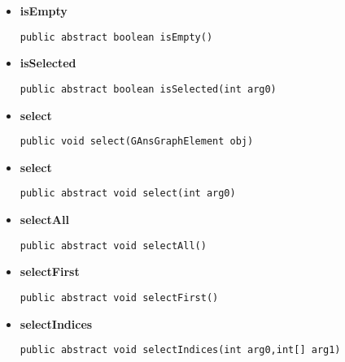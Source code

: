 {{{{{{{{{\begin{itemize}
{\begin{itemize}
{Returns the \texttt{\small GAnsProperty}{\small 
{}} of all selected items.
}
\item{{\bf  Returns} -- 
A list with all the \texttt{\small GAnsProperty}{\small 
{}} of all selected items. 
}%
\end{itemize}
}%
\item{ 
{\bf  isEmpty}\\
\begin{lstlisting}[frame=none]
public abstract boolean isEmpty()\end{lstlisting} %
}%
\item{ 
{\bf  isSelected}\\
\begin{lstlisting}[frame=none]
public abstract boolean isSelected(int arg0)\end{lstlisting} %
}%
\item{ 
{\bf  select}\\
\begin{lstlisting}[frame=none]
public void select(GAnsGraphElement obj)\end{lstlisting} %
}%
\item{ 
{\bf  select}\\
\begin{lstlisting}[frame=none]
public abstract void select(int arg0)\end{lstlisting} %
}%
\item{ 
{\bf  selectAll}\\
\begin{lstlisting}[frame=none]
public abstract void selectAll()\end{lstlisting} %
}%
\item{ 
{\bf  selectFirst}\\
\begin{lstlisting}[frame=none]
public abstract void selectFirst()\end{lstlisting} %
}%
\item{ 
{\bf  selectIndices}\\
\begin{lstlisting}[frame=none]
public abstract void selectIndices(int arg0,int[] arg1)\end{lstlisting} %
}
\end{itemize}}}}}}}}}}
